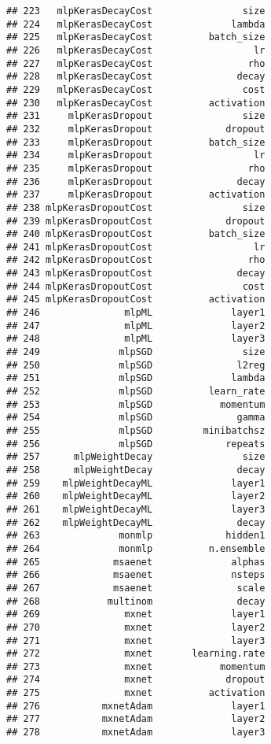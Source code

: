 \documentclass[
]{article}
\begin{document}
\begin{verbatim}
## 223   mlpKerasDecayCost                size
## 224   mlpKerasDecayCost              lambda
## 225   mlpKerasDecayCost          batch_size
## 226   mlpKerasDecayCost                  lr
## 227   mlpKerasDecayCost                 rho
## 228   mlpKerasDecayCost               decay
## 229   mlpKerasDecayCost                cost
## 230   mlpKerasDecayCost          activation
## 231     mlpKerasDropout                size
## 232     mlpKerasDropout             dropout
## 233     mlpKerasDropout          batch_size
## 234     mlpKerasDropout                  lr
## 235     mlpKerasDropout                 rho
## 236     mlpKerasDropout               decay
## 237     mlpKerasDropout          activation
## 238 mlpKerasDropoutCost                size
## 239 mlpKerasDropoutCost             dropout
## 240 mlpKerasDropoutCost          batch_size
## 241 mlpKerasDropoutCost                  lr
## 242 mlpKerasDropoutCost                 rho
## 243 mlpKerasDropoutCost               decay
## 244 mlpKerasDropoutCost                cost
## 245 mlpKerasDropoutCost          activation
## 246               mlpML              layer1
## 247               mlpML              layer2
## 248               mlpML              layer3
## 249              mlpSGD                size
## 250              mlpSGD               l2reg
## 251              mlpSGD              lambda
## 252              mlpSGD          learn_rate
## 253              mlpSGD            momentum
## 254              mlpSGD               gamma
## 255              mlpSGD         minibatchsz
## 256              mlpSGD             repeats
## 257      mlpWeightDecay                size
## 258      mlpWeightDecay               decay
## 259    mlpWeightDecayML              layer1
## 260    mlpWeightDecayML              layer2
## 261    mlpWeightDecayML              layer3
## 262    mlpWeightDecayML               decay
## 263              monmlp             hidden1
## 264              monmlp          n.ensemble
## 265             msaenet              alphas
## 266             msaenet              nsteps
## 267             msaenet               scale
## 268            multinom               decay
## 269               mxnet              layer1
## 270               mxnet              layer2
## 271               mxnet              layer3
## 272               mxnet       learning.rate
## 273               mxnet            momentum
## 274               mxnet             dropout
## 275               mxnet          activation
## 276           mxnetAdam              layer1
## 277           mxnetAdam              layer2
## 278           mxnetAdam              layer3

\end{verbatim}
\end{document}
